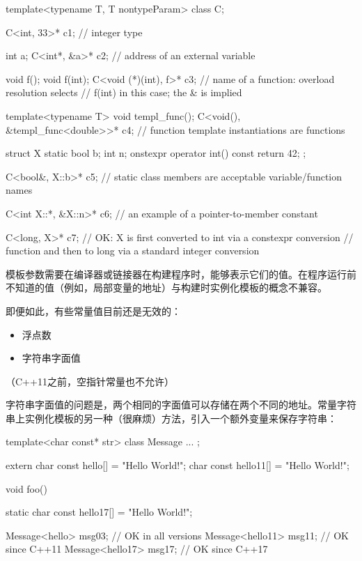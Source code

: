 \begin{cpp}
template<typename T, T nontypeParam>
class C;

C<int, 33>* c1; // integer type

int a;
C<int*, &a>* c2; // address of an external variable

void f();
void f(int);
C<void (*)(int), f>* c3; // name of a function: overload resolution selects
						// f(int) in this case; the & is implied

template<typename T> void templ_func();
C<void(), &templ_func<double>>* c4; // function template instantiations are functions

struct X {
	static bool b;
	int n;
	onstexpr operator int() const { return 42; }
};

C<bool&, X::b>* c5; // static class members are acceptable variable/function names

C<int X::*, &X::n>* c6; // an example of a pointer-to-member constant

C<long, X{}>* c7; // OK: X is first converted to int via a constexpr conversion
// function and then to long via a standard integer conversion
\end{cpp}

模板参数需要在编译器或链接器在构建程序时，能够表示它们的值。在程序运行前不知道的值（例如，局部变量的地址）与构建时实例化模板的概念不兼容。

即便如此，有些常量值目前还是无效的：

\begin{itemize}
\item 
浮点数

\item 
字符串字面值
\end{itemize}

（C++11之前，空指针常量也不允许）

字符串字面值的问题是，两个相同的字面值可以存储在两个不同的地址。常量字符串上实例化模板的另一种（很麻烦）方法，引入一个额外变量来保存字符串：

\begin{cpp}
template<char const* str>
class Message {
	...
};

extern char const hello[] = "Hello World!";
char const hello11[] = "Hello World!";

void foo()
{
	static char const hello17[] = "Hello World!";
	
	Message<hello> msg03; // OK in all versions
	Message<hello11> msg11; // OK since C++11
	Message<hello17> msg17; // OK since C++17
}
\end{cpp}

